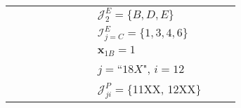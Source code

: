 \documentclass{article}
\begin{document}
\begin{tabular}{p{0.3\linewidth}p{0.5\linewidth}}
    & $\mathcal{J}^E_2 = \{ B, D, E\}$\\
    & $\mathcal{I}^E_{j=C} = \{ 1, 3, 4, 6\}$\\
    & $\bm{x}_{1B} = 1$\\
    & $j=$``$18X$", $i=12$\\
    & $\mathcal{J}^P_{ji} = \{$11XX, 12XX$\}$
\end{tabular}
\end{document}
